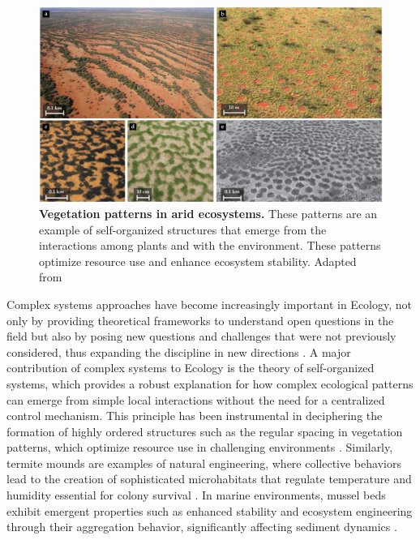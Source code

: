 \begin{figure}[H]
  \centering
  \includegraphics[width=\textwidth]{Figures/vegetation_patterns.jpg}
  \caption[Vegetation patterns in arid
    ecosystems]{\label{fig:vegetation_patterns} \textbf{Vegetation patterns in
      arid ecosystems.} These patterns are an example of self-organized
    structures that emerge from the interactions among plants and with the
    environment. These patterns optimize resource use and enhance ecosystem
    stability. Adapted from \cite{Ehud2019}}
\end{figure}

Complex systems approaches have become increasingly important in Ecology, not
only by providing theoretical frameworks to understand open questions in the
field but also by posing new questions and challenges that were not previously
considered, thus expanding the discipline in new directions \cite{Milne1998}. A
major contribution of complex systems to Ecology is the theory of
self-organized systems, which provides a robust explanation for how
complex ecological patterns can emerge from simple local interactions without
the need for a centralized control mechanism. This principle has been
instrumental in deciphering the formation of highly ordered structures such as
the regular spacing in vegetation patterns, which optimize resource use in
challenging environments \cite{Tarnita2017}. Similarly, termite mounds are
examples of natural engineering, where collective behaviors lead to the
creation of sophisticated microhabitats that regulate temperature and humidity
essential for colony survival \cite{Heyde2021}. In marine environments, mussel
beds exhibit emergent properties such as enhanced stability and ecosystem
engineering through their aggregation behavior, significantly affecting
sediment dynamics \cite{Koppel2008}.


